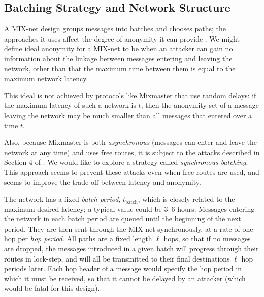 \documentclass{llncs}
\begin{document}
\subsection{Batching Strategy and Network Structure}
\label{subsec:batching}


A MIX-net design groups messages into batches and chooses paths; the
approaches it uses affect the degree of anonymity it can provide
\cite{batching-taxonomy}.
We might define ideal anonymity for a MIX-net to be when an attacker can
gain no information about the linkage between messages entering and
leaving the network, other than that the maximum time between them is
equal to the maximum network latency.


This ideal is not achieved by protocols like Mixmaster that use random
delays: if the maximum latency of such a network is $t$, then the
anonymity set of a message leaving the network may be much smaller
than all messages that entered over a time $t$.

Also, because Mixmaster is both {\em asynchronous} (messages can enter and
leave the network at any time) and uses free routes, it is subject to
the attacks described in Section 4 of \cite{disad-free-routes}.
We would like to explore a
strategy called {\em synchronous batching}. This approach seems to prevent
these attacks even when free routes are used, and seems to improve the
trade-off between latency and anonymity.

The network has a fixed {\em batch period}, $t_\mathrm{batch}$, which is closely
related to the maximum desired latency; a typical value could be 3--6 hours.
Messages entering the network in each batch period are queued until
the beginning of the next period. They are then sent through the MIX-net
synchronously, at a rate of one hop per {\em hop period}. All paths are
a fixed length $\ell$ hops, so that if no messages are dropped, the messages
introduced in a given batch will progress through their routes in
lock-step, and will all be transmitted to their final destinations $\ell$
hop periods later. Each hop header of a message would specify the hop
period in which it must be received, so that it cannot be delayed by an
attacker (which would be fatal for this design).
\end{document}
